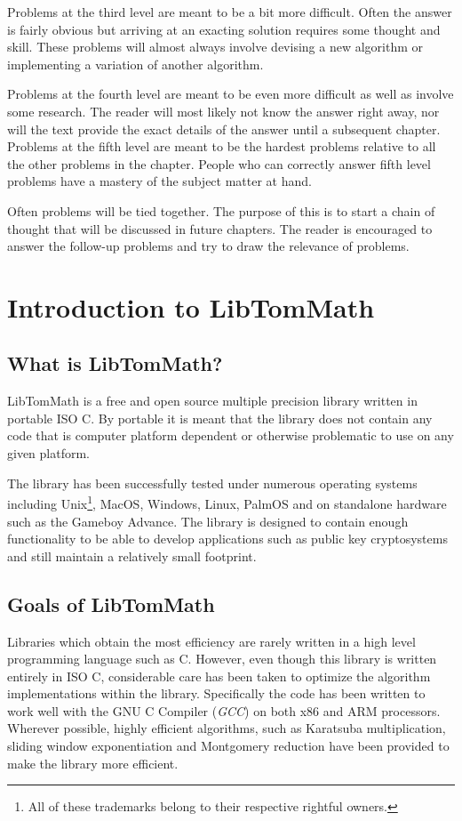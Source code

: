 \documentclass[b5paper]{book}
\begin{document}
Problems at the third level are meant to be a bit more difficult.  Often the answer is fairly obvious but arriving at an exacting solution
requires some thought and skill.  These problems will almost always involve devising a new algorithm or implementing a variation of
another algorithm.

Problems at the fourth level are meant to be even more difficult as well as involve some research.  The reader will most 
likely not know the answer right away, nor will the text provide the exact details of the answer until a subsequent 
chapter.  Problems at the fifth level are meant to be the hardest problems relative to all the other problems in the 
chapter.  People who can correctly answer fifth level problems have a mastery of the subject matter at hand.

Often problems will be tied together.  The purpose of this is to start a chain of thought that will be discussed in future chapters.  The reader
is encouraged to answer the follow-up problems and try to draw the relevance of problems.

\chapter{Introduction to LibTomMath}

\section{What is LibTomMath?}
LibTomMath is a free and open source multiple precision library written in portable ISO C.  By portable it is 
meant that the library does not contain any code that is computer platform dependent or otherwise problematic to use on 
any given platform.  

The library has been successfully tested under numerous operating systems including Unix\footnote{All of these
trademarks belong to their respective rightful owners.}, MacOS, Windows, Linux, PalmOS and on standalone hardware such 
as the Gameboy Advance.  The library is designed to contain enough functionality to be able to develop applications such 
as public key cryptosystems and still maintain a relatively small footprint.

\section{Goals of LibTomMath}

Libraries which obtain the most efficiency are rarely written in a high level programming language such as C.  However, 
even though this library is written entirely in ISO C, considerable care has been taken to optimize the algorithm implementations within the 
library.  Specifically the code has been written to work well with the GNU C Compiler (\textit{GCC}) on both x86 and ARM 
processors.  Wherever possible, highly efficient algorithms, such as Karatsuba multiplication, sliding window 
exponentiation and Montgomery reduction have been provided to make the library more efficient.  
\end{document}
